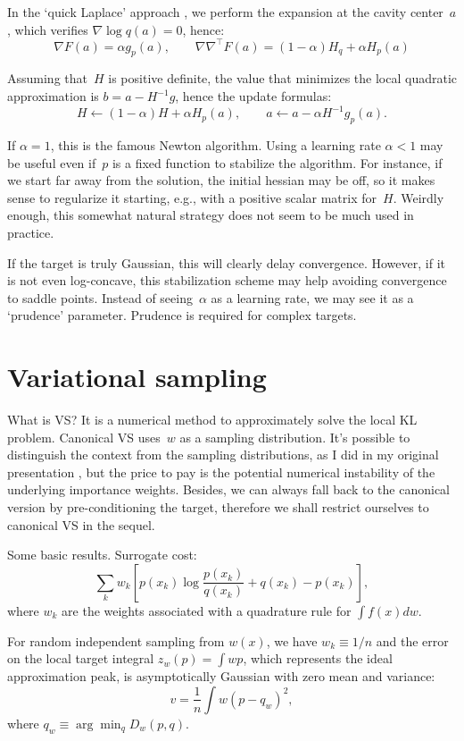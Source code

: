 \documentclass{article}
\begin{document}
In the `quick Laplace' approach \cite{rr:16}, we perform the expansion at the cavity center~$a$, which verifies $\nabla \log q(a)=0$, hence:
$$
\nabla F(a) = \alpha g_p(a),
\qquad
\nabla\nabla^\top F(a) = (1-\alpha)H_q + \alpha H_p(a)
$$

Assuming that~$H$ is positive definite, the value that minimizes the local quadratic approximation is $b = a - H^{-1}g$, hence the update formulas:
$$
H \leftarrow (1-\alpha)H + \alpha H_p(a),
\qquad
a \leftarrow a - \alpha H ^{-1}g_p(a).
$$

If $\alpha=1$, this is the famous Newton algorithm. Using a learning rate $\alpha < 1$ may be useful even if~$p$ is a fixed function to stabilize the algorithm. For instance, if we start far away from the solution, the initial hessian may be off, so it makes sense to regularize it starting, e.g., with a positive scalar matrix for~$H$. Weirdly enough, this somewhat natural strategy does not seem to be much used in practice. 

If the target is truly Gaussian, this will clearly delay convergence. However, if it is not even log-concave, this stabilization scheme may help avoiding convergence to saddle points. Instead of seeing~$\alpha$ as a learning rate, we may see it as a `prudence' parameter. Prudence is required for complex targets. 



\section{Variational sampling}

What is VS? It is a numerical method to approximately solve the local KL problem. Canonical VS uses~$w$ as a sampling distribution. It's possible to distinguish the context from the sampling distributions, as I did in my original presentation \cite{ijasp:13}, but the price to pay is the potential numerical instability of the underlying importance weights. Besides, we can always fall back to the canonical version by pre-conditioning the target, therefore we shall restrict ourselves to canonical VS in the sequel.

Some basic results. Surrogate cost:
$$
\sum_k 
w_k \left[
p(x_k) \log \frac{p(x_k)}{q(x_k)} + q(x_k) - p(x_k)
\right],
$$
where $w_k$ are the weights associated with a quadrature rule for $\int f(x)dw$. 

For random independent sampling from $w(x)$, we have $w_k\equiv 1/n$ and the error on the local target integral $z_w(p)= \int wp$, which represents the ideal approximation peak, is asymptotically Gaussian with zero mean and variance:
$$
v = \frac{1}{n} \int w(p-q_w)^2 ,
$$
where $q_w\equiv\arg\min_q D_w(p,q)$.
\end{document}
